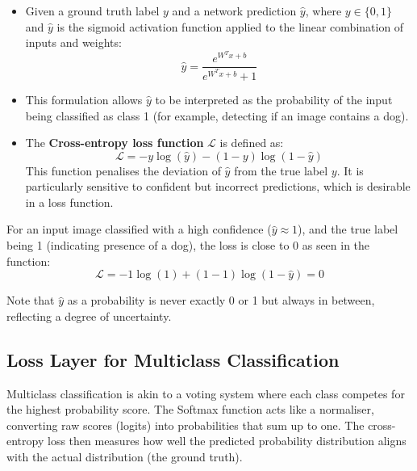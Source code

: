 \begin{itemize}
    \item Given a ground truth label \( y \) and a network prediction \( \hat{y} \), where \( y \in \{0,1\} \) and \( \hat{y} \) is the sigmoid activation function applied to the linear combination of inputs and weights:
    \[ \hat{y} = \frac{e^{W^Tx+b}}{e^{W^Tx+b}+1} \]
    \item This formulation allows \( \hat{y} \) to be interpreted as the probability of the input being classified as class 1 (for example, detecting if an image contains a dog).
    
    \item The \textbf{Cross-entropy loss function} \( \mathcal{L} \) is defined as:
    \[ \mathcal{L} = -y \log(\hat{y}) - (1-y) \log(1-\hat{y}) \]
    This function penalises the deviation of \( \hat{y} \) from the true label \( y \). It is particularly sensitive to confident but incorrect predictions, which is desirable in a loss function.
\end{itemize}



For an input image classified with a high confidence (\( \hat{y} \approx 1 \)), and the true label being 1 (indicating presence of a dog), the loss is close to 0 as seen in the function:
\[ \mathcal{L} = -1 \log(1) + (1-1) \log(1 - \hat{y}) = 0 \]

Note that \( \hat{y} \) as a probability is never exactly 0 or 1 but always in between, reflecting a degree of uncertainty.

\subsection*{Loss Layer for Multiclass Classification}

Multiclass classification is akin to a voting system where each class competes for the highest probability score. The Softmax function acts like a normaliser, converting raw scores (logits) into probabilities that sum up to one. The cross-entropy loss then measures how well the predicted probability distribution aligns with the actual distribution (the ground truth). 




